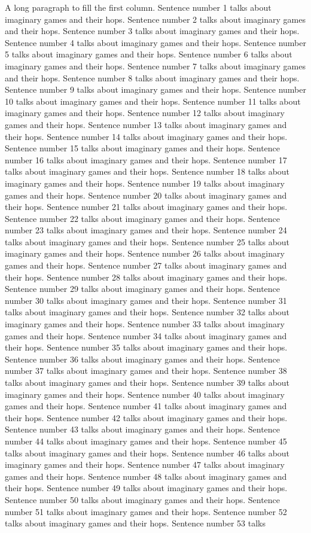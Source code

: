 \documentclass[twocolumn]{article}
\begin{document}
A long paragraph to fill the first column. Sentence number 1 talks about imaginary games and their hops. Sentence number 2 talks about imaginary games and their hops. Sentence number 3 talks about imaginary games and their hops. Sentence number 4 talks about imaginary games and their hops. Sentence number 5 talks about imaginary games and their hops. Sentence number 6 talks about imaginary games and their hops. Sentence number 7 talks about imaginary games and their hops. Sentence number 8 talks about imaginary games and their hops. Sentence number 9 talks about imaginary games and their hops. Sentence number 10 talks about imaginary games and their hops. Sentence number 11 talks about imaginary games and their hops. Sentence number 12 talks about imaginary games and their hops. Sentence number 13 talks about imaginary games and their hops. Sentence number 14 talks about imaginary games and their hops. Sentence number 15 talks about imaginary games and their hops. Sentence number 16 talks about imaginary games and their hops. Sentence number 17 talks about imaginary games and their hops. Sentence number 18 talks about imaginary games and their hops. Sentence number 19 talks about imaginary games and their hops. Sentence number 20 talks about imaginary games and their hops. Sentence number 21 talks about imaginary games and their hops. Sentence number 22 talks about imaginary games and their hops. Sentence number 23 talks about imaginary games and their hops. Sentence number 24 talks about imaginary games and their hops. Sentence number 25 talks about imaginary games and their hops. Sentence number 26 talks about imaginary games and their hops. Sentence number 27 talks about imaginary games and their hops. Sentence number 28 talks about imaginary games and their hops. Sentence number 29 talks about imaginary games and their hops. Sentence number 30 talks about imaginary games and their hops. Sentence number 31 talks about imaginary games and their hops. Sentence number 32 talks about imaginary games and their hops. Sentence number 33 talks about imaginary games and their hops. Sentence number 34 talks about imaginary games and their hops. Sentence number 35 talks about imaginary games and their hops. Sentence number 36 talks about imaginary games and their hops. Sentence number 37 talks about imaginary games and their hops. Sentence number 38 talks about imaginary games and their hops. Sentence number 39 talks about imaginary games and their hops. Sentence number 40 talks about imaginary games and their hops. Sentence number 41 talks about imaginary games and their hops. Sentence number 42 talks about imaginary games and their hops. Sentence number 43 talks about imaginary games and their hops. Sentence number 44 talks about imaginary games and their hops. Sentence number 45 talks about imaginary games and their hops. Sentence number 46 talks about imaginary games and their hops. Sentence number 47 talks about imaginary games and their hops. Sentence number 48 talks about imaginary games and their hops. Sentence number 49 talks about imaginary games and their hops. Sentence number 50 talks about imaginary games and their hops. Sentence number 51 talks about imaginary games and their hops. Sentence number 52 talks about imaginary games and their hops. Sentence number 53 talks 
\end{document}
